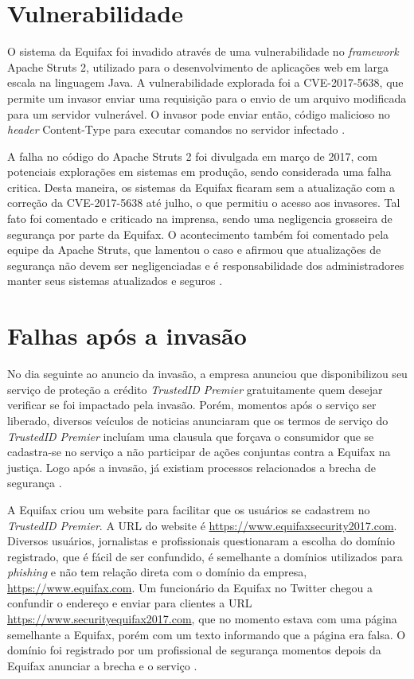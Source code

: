 \documentclass[conference]{IEEEtran}
\begin{document}
\section{Vulnerabilidade}
O sistema da Equifax foi invadido através de uma vulnerabilidade no \textit{framework} Apache Struts 2, utilizado para o desenvolvimento de aplicações web em larga escala na linguagem Java. A vulnerabilidade explorada
foi a CVE-2017-5638, que permite um invasor enviar uma requisição para o envio de um arquivo modificada para um servidor vulnerável. O invasor pode enviar então, código malicioso no \textit{header} Content-Type para
executar comandos no servidor infectado \cite{Luszcz2018} \cite{Sahu2017}.

A falha no código do Apache Struts 2 foi divulgada em março de 2017, com potenciais explorações em sistemas em produção, sendo considerada uma falha critica. Desta maneira, os 
sistemas da Equifax ficaram sem a atualização com a correção da CVE-2017-5638 até julho, o que permitiu o acesso aos invasores. Tal fato foi comentado e criticado na imprensa, 
sendo uma negligencia grosseira de segurança por parte da Equifax. O acontecimento também foi comentado pela equipe da Apache Struts, que lamentou o caso e afirmou que 
atualizações de segurança não devem ser negligenciadas e é responsabilidade dos administradores manter seus sistemas atualizados e seguros \cite{Newman2017} \cite{Goodin2017} 
\cite{Dignan2017} \cite{Struts20171} \cite{Struts20172}.

\section{Falhas após a invasão}
No dia seguinte ao anuncio da invasão, a empresa anunciou que disponibilizou seu serviço de proteção a crédito \textit{TrustedID Premier} gratuitamente quem desejar verificar se foi impactado pela invasão. 
Porém, momentos após o serviço ser liberado, diversos veículos de noticias anunciaram que os termos de serviço do \textit{TrustedID Premier} incluíam uma clausula que forçava o consumidor que se cadastra-se
no serviço a não participar de ações conjuntas contra a Equifax na justiça. Logo após a invasão, já existiam processos relacionados a brecha de segurança \cite{Mosendz2017} \cite{Robertson2017} \cite{Grant2017}.

A Equifax criou um website para facilitar que os usuários se cadastrem no \textit{TrustedID Premier}. A URL do website é \url{https://www.equifaxsecurity2017.com}. Diversos usuários, jornalistas e profissionais 
questionaram a escolha do domínio registrado, que é fácil de ser confundido, é semelhante a domínios utilizados para \textit{phishing} e não tem relação direta com o domínio da empresa, \url{https://www.equifax.com}.
Um funcionário da Equifax no Twitter chegou a confundir o endereço e enviar para clientes a URL \url{https://www.securityequifax2017.com}, que no momento estava com uma página semelhante a Equifax, porém com um texto
informando que a página era falsa. O domínio foi registrado por um profissional de segurança momentos depois da Equifax anunciar a brecha e o serviço \cite{Mak2017} \cite{Deahl2017} \cite{Burns2017}. 
\end{document}
